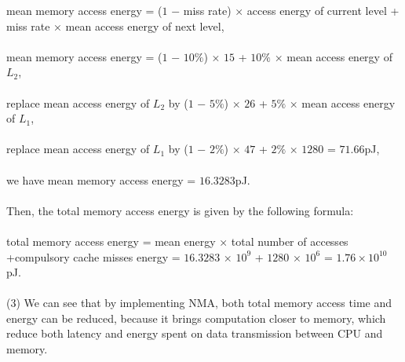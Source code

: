 \documentclass[11pt]{article}
\begin{document}
\begin{solution}
mean memory access energy = ($1$ $-$ miss rate) × access energy of current level
+ miss rate × mean access energy of next level,
\\
\\
mean memory access energy = ($1$ $-$ $10\%$) × $15$ + $10\%$ × mean access energy of $L_2$,
\\
\\
replace mean access energy of $L_2$ by ($1$ $-$ $5\%$) × $26$ + $5\%$ × mean access energy of $L_1$,
\\
\\
replace mean access energy of $L_1$ by ($1$ $-$ $2\%$) × $47$ + $2\%$ × $1280$ = $71.66$pJ,
\\
\\
we have mean memory access energy = $16.3283$pJ.
\\
\\
Then, the total memory access energy is given by the following formula:
\\
\\
total memory access energy = mean energy × total number of accesses
+compulsory cache misses energy = $16.3283$ × $10^9$ + $1280$ × $10^6$ = $1.76\times10^{10}$pJ.
\\
\\
(3) We can see that by implementing NMA, both total memory access time and energy can be reduced, because it brings computation closer to memory, which reduce both latency and energy spent on data transmission between CPU and memory.
\end{solution}
\setcounter{page}{10}
\end{document}
